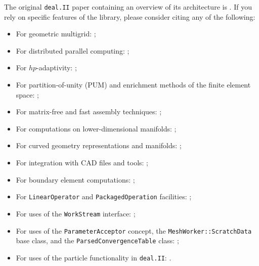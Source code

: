 \documentclass{ansarticle-preprint}
\newcommand{\specialword}[1]{\texttt{#1}}
\newcommand{\dealii}{{\specialword{deal.II}}\xspace}
\begin{document}
The original \dealii{} paper containing an overview of its
architecture is \cite{BangerthHartmannKanschat2007}. If you rely on
specific features of the library, please consider citing any of the
following:
\begin{multicols}{2}
  \vspace*{-36pt}
  \begin{itemize}
    \item For geometric multigrid: \cite{Kanschat2004,JanssenKanschat2011,ClevengerHeisterKanschatKronbichler2019};
    \item For distributed parallel computing: \cite{BangerthBursteddeHeisterKronbichler11};
    \item For $hp$-adaptivity: \cite{BangerthKayserHerold2007};
    \item For partition-of-unity (PUM) and enrichment methods of the
          finite element space: \cite{Davydov2016};
    \item For matrix-free and fast assembly techniques:
          \cite{KronbichlerKormann2012,KronbichlerKormann2019};
    \item For computations on lower-dimensional manifolds:
          \cite{DeSimoneHeltaiManigrasso2009};
    \item For curved geometry representations and manifolds:
          \cite{HeltaiBangerthKronbichlerMola2019};
          \vfill\null  \columnbreak
    \item For integration with CAD files and tools:
          \cite{HeltaiMola2015};
    \item For boundary element computations:
          \cite{GiulianiMolaHeltai-2018-a};
    \item For \texttt{LinearOperator} and \texttt{PackagedOperation} facilities:
          \cite{MaierBardelloniHeltai-2016-a,MaierBardelloniHeltai-2016-b};
    \item For uses of the \texttt{WorkStream} interface:
          \cite{TKB16};
    \item For uses of the \texttt{ParameterAcceptor} concept, the
          \texttt{MeshWorker::ScratchData} base class, and the
          \texttt{ParsedConvergenceTable} class:
          \cite{SartoriGiulianiBardelloni-2018-a};
    \item For uses of the particle functionality in \dealii{}:
          \cite{GLHPB18}.
          \vfill\null
  \end{itemize}
\end{multicols}
\end{document}
